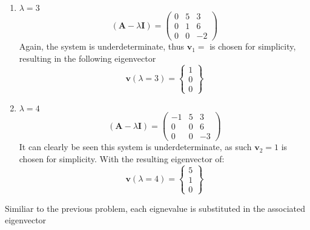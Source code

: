 \begin{enumerate}
\item $\lambda=3$
		\begin{equation*}
		\left(\boldsymbol{A}-\lambda\boldsymbol{I}\right)=
		\begin{pmatrix}
			0&5&3\\0&1&6\\0&0&-2
		\end{pmatrix}
		\end{equation*}
Again, the system is underdeterminate, thus $\boldsymbol{v}_1=$ is chosen for simplicity, resulting in the following eigenvector
	\begin{equation*}
	\boxed{
			\boldsymbol{v}\left(\lambda=3\right)=
		\begin{Bmatrix}
			1\\0\\0
		\end{Bmatrix}}
	\end{equation*}
\item $\lambda=4$
		\begin{equation*}
		\left(\boldsymbol{A}-\lambda\boldsymbol{I}\right)=
		\begin{pmatrix}
			-1&5&3\\0&0&6\\0&0&-3
		\end{pmatrix}
		\end{equation*}
It can clearly be seen this system is underdeterminate, as such $\boldsymbol{v}_2=1$ is chosen for simplicity. With the resulting eigenvector of:
	\begin{equation*}
	\boxed{
			\boldsymbol{v}\left(\lambda=4\right)=
		\begin{Bmatrix}
			5\\1\\0
		\end{Bmatrix}}
	\end{equation*}
\end{enumerate}
Similiar to the previous problem, each eignevalue is substituted in the associated eigenvector
